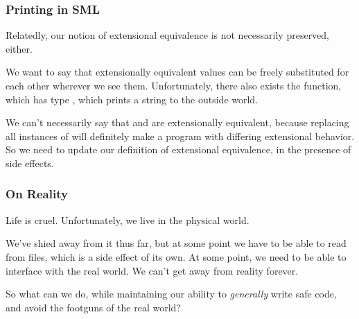 \documentclass[aspectratio=169]{beamer}
\begin{document}
\begin{frame}[fragile]
  \frametitle{Printing in SML}

  Relatedly, our notion of extensional equivalence is not necessarily preserved,
  either.

  \pause
  \vspace{\fill}

  We want to say that extensionally equivalent values can be freely substituted
  for each other wherever we see them. Unfortunately, there also exists
  the  function, which has type , which
  prints a string to the outside world.

  \pause
  \vspace{\fill}

  We can't necessarily say that  and \code{()} are extensionally
  equivalent, because replacing all instances of \code{()} will definitely make
  a program with differing extensional behavior. So we need to update our
  definition of extensional equivalence, in the presence of side effects.
\end{frame}


\begin{frame}[fragile]
  \frametitle{On Reality}

  Life is cruel. Unfortunately, we live in the physical world.

  \pause
  \vspace{\fill}

  We've shied away from it thus far, but at some point we have to be able to read
  from files, which is a side effect of its own. At some point, we need to be able
  to interface with the real world. We can't get away from reality forever.

  \pause
  \vspace{\fill}

  So what can we do, while maintaining our ability to \textit{generally} write
  safe code, and avoid the footguns of the real world?
\end{frame}
\end{document}
